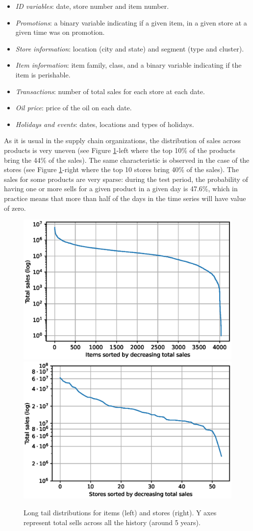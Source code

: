 \begin{itemize}
	\item \textit{ID variables}: date, store number and item number.
	\item \textit{Promotions}: a binary variable indicating if a given item, in a given store at a given time was on promotion.
	\item \textit{Store information}: location (city and state) and segment (type and cluster).
	\item \textit{Item information}: item family, class, and a binary variable indicating if the item is perishable.
	\item \textit{Transactions}: number of total sales for each store at each date.
	\item \textit{Oil price}: price of the oil on each date.
	\item \textit{Holidays and events}: dates, locations and types of holidays.
\end{itemize}

As it is usual in the supply chain organizations, the distribution of sales across products is very uneven (see Figure \ref{fig:tails}-left where the top 10\% of the products bring the 44\% of the sales). The same characteristic is observed in the case of the stores (see Figure \ref{fig:tails}-right where the top 10 stores bring 40\% of the sales). The sales for some products are very sparse: during the test period, the probability of having one or more sells for a given product in a given day is 47.6\%, which in practice means that more than half of the days in the time series will have value of zero.

\begin{figure}
	\centering
	\includegraphics[width=0.48\linewidth]{salesforecast/images/items_tail_log}
	\includegraphics[width=0.48\linewidth]{salesforecast/images/stores_tail_log}
	\caption[Long tail distributions of sales across items and stores]{Long tail distributions for items (left) and stores (right). Y axes represent total sells across all the history (around 5 years).}
	\label{fig:tails}
\end{figure}

